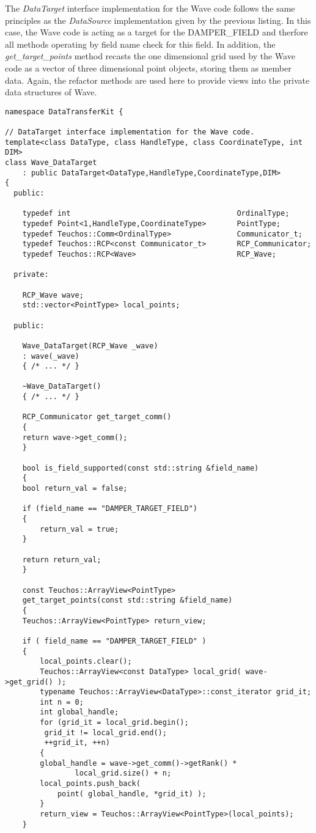 \documentclass[letterpaper]{article}
\begin{document}
The {\sl DataTarget} interface implementation for the Wave code
follows the same principles as the {\sl DataSource} implementation
given by the previous listing. In this case, the Wave code is acting
as a target for the DAMPER\_FIELD and therfore all methods operating
by field name check for this field. In addition, the {\sl
  get\_target\_points} method recasts the one dimensional grid used by
the Wave code as a vector of three dimensional point objects, storing
them as member data. Again, the refactor methods are used here to
provide views into the private data structures of Wave.

\begin{lstlisting}
namespace DataTransferKit {

// DataTarget interface implementation for the Wave code.
template<class DataType, class HandleType, class CoordinateType, int DIM>
class Wave_DataTarget 
    : public DataTarget<DataType,HandleType,CoordinateType,DIM>
{
  public:

    typedef int                                      OrdinalType;
    typedef Point<1,HandleType,CoordinateType>       PointType;
    typedef Teuchos::Comm<OrdinalType>               Communicator_t;
    typedef Teuchos::RCP<const Communicator_t>       RCP_Communicator;
    typedef Teuchos::RCP<Wave>                       RCP_Wave;

  private:

    RCP_Wave wave;
    std::vector<PointType> local_points;

  public:

    Wave_DataTarget(RCP_Wave _wave)
	: wave(_wave)
    { /* ... */ }

    ~Wave_DataTarget()
    { /* ... */ }

    RCP_Communicator get_target_comm()
    {
	return wave->get_comm();
    }

    bool is_field_supported(const std::string &field_name)
    {
	bool return_val = false;

	if (field_name == "DAMPER_TARGET_FIELD")
	{
	    return_val = true;
	}

	return return_val;
    }

    const Teuchos::ArrayView<PointType> 
    get_target_points(const std::string &field_name)
    {
	Teuchos::ArrayView<PointType> return_view;

	if ( field_name == "DAMPER_TARGET_FIELD" )
	{
	    local_points.clear();
	    Teuchos::ArrayView<const DataType> local_grid( wave->get_grid() );
	    typename Teuchos::ArrayView<DataType>::const_iterator grid_it;
	    int n = 0;
	    int global_handle;
	    for (grid_it = local_grid.begin(); 
		 grid_it != local_grid.end();
		 ++grid_it, ++n)
	    {
		global_handle = wave->get_comm()->getRank() *
				local_grid.size() + n;
		local_points.push_back( 
		    point( global_handle, *grid_it) );
	    }
	    return_view = Teuchos::ArrayView<PointType>(local_points);
	}


\end{lstlisting}
\end{document}
